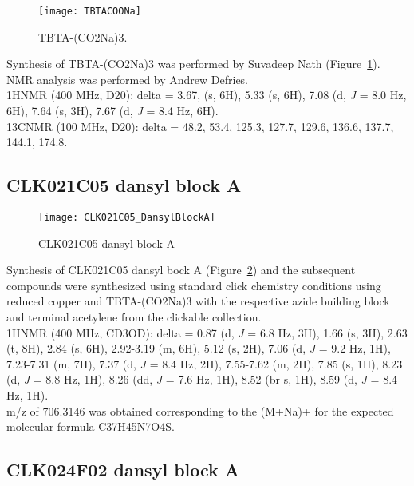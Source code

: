 \begin{figure}
\centering
\texttt{[image: TBTACOONa]}
\caption{TBTA-(CO2Na)3.}
\label{fig:TBTACOONa}
\end{figure}

Synthesis of TBTA-(CO2Na)3 was performed by Suvadeep Nath (Figure~\ref{fig:TBTACOONa}). NMR analysis was performed by Andrew Defries. \\

\noindent
1HNMR (400 MHz, D20): delta = 3.67, (s, 6H), 5.33 (s, 6H), 7.08 (d, {\it J} = 8.0 Hz, 6H), 7.64 (s, 3H), 7.67 (d, {\it J} = 8.4 Hz, 6H). \\

\noindent
13CNMR (100 MHz, D20): delta = 48.2, 53.4, 125.3, 127.7, 129.6, 136.6, 137.7, 144.1, 174.8. \\


\clearpage

\subsection{CLK021C05 dansyl block A}

\begin{figure}
\centering
\texttt{[image: CLK021C05\_DansylBlockA]}
\caption{CLK021C05 dansyl block A}
\label{fig:CLK021C05_DansylBlockA}
\end{figure}

Synthesis of CLK021C05 dansyl bock A (Figure~\ref{fig:CLK021C05_DansylBlockA}) and the subsequent compounds were synthesized using standard click chemistry conditions using reduced copper and TBTA-(CO2Na)3 with the respective azide building block and terminal acetylene from the clickable collection. \\

\noindent
1HNMR (400 MHz, CD3OD): delta = 0.87 (d, {\it J} = 6.8 Hz, 3H), 1.66 (s, 3H), 2.63 (t, 8H), 2.84 (s, 6H), 2.92-3.19 (m, 6H), 5.12 (s, 2H), 7.06 (d, {\it J} = 9.2 Hz, 1H), 7.23-7.31 (m, 7H), 7.37 (d, {\it J} = 8.4 Hz, 2H), 7.55-7.62 (m, 2H), 7.85 (s, 1H), 8.23 (d, {\it J} = 8.8 Hz, 1H), 8.26 (dd, {\it J} = 7.6 Hz, 1H), 8.52 (br s, 1H), 8.59 (d, {\it J} = 8.4 Hz, 1H). \\

\noindent
m/z of 706.3146 was obtained corresponding to the (M+Na)+ for the expected molecular formula C37H45N7O4S. \\

\clearpage

\subsection{CLK024F02 dansyl block A}

